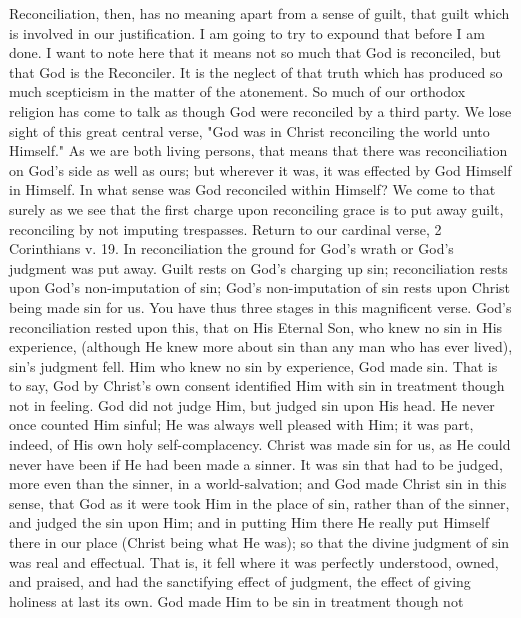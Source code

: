 \documentclass[12pt,a5paper,twoside,titlepage]{book}
\begin{document}
Reconciliation, then, has no meaning apart 
from a sense of guilt, that guilt which is involved 
in our justification. I am going to try to 
expound that before I am done. I want to note 
here that it means not so much that God is reconciled,
but that God is the Reconciler. It is the 
neglect of that truth which has produced so much 
scepticism in the matter of the atonement. So 
much of our orthodox religion has come to talk 
as though God were reconciled by a third party. 
We lose sight of this great central verse, 
"God was in Christ reconciling the world unto 
Himself." As we are both living persons, that 
means that there was reconciliation on God's 
side as well as ours; but wherever it was, it was 
effected by God Himself in Himself. In what 
sense was God reconciled within Himself? We 
come to that surely as we see that the first 
charge upon reconciling grace is to put away 
guilt, reconciling by not imputing trespasses. 
Return to our cardinal verse, 2 Corinthians 
v. 19. In reconciliation the ground for 
God's wrath or God's judgment was put away. 
Guilt rests on God's charging up sin; reconciliation 
rests upon God's non-imputation 
of sin; God's non-imputation of sin rests upon 
Christ being made sin for us. You have thus 
three stages in this magnificent verse. God's 
reconciliation rested upon this, that on His 
Eternal Son, who knew no sin in His experience, 
(although He knew more about sin than any 
man who has ever lived), sin's judgment fell. 
Him who knew no sin by experience, God made 
sin. That is to say, God by Christ's own consent 
identified Him with sin in treatment though 
not in feeling. God did not judge Him, but 
judged sin upon His head. He never once 
counted Him sinful; He was always well 
pleased with Him; it was part, indeed, of His 
own holy self-complacency. Christ was made sin 
for us, as He could never have been if He had 
been made a sinner. It was sin that had to be 
judged, more even than the sinner, in a world-salvation; 
and God made Christ sin in this sense, 
that God as it were took Him in the place of sin, 
rather than of the sinner, and judged the sin 
upon Him; and in putting Him there He really 
put Himself there in our place (Christ being 
what He was); so that the divine judgment of 
sin was real and effectual. That is, it fell where 
it was perfectly understood, owned, and praised, 
and had the sanctifying effect of judgment, the 
effect of giving holiness at last its own. God 
made Him to be sin in treatment though not 
\end{document}
